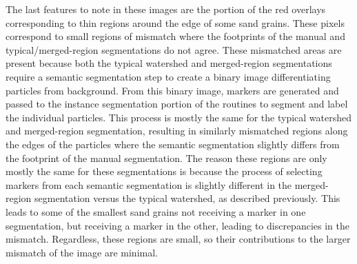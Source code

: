 The last features to note in these images are the portion of the red overlays
corresponding to thin regions around the edge of some sand grains. These pixels
correspond to small regions of mismatch where the footprints of the manual and
typical/merged-region segmentations do not agree. These mismatched areas are present
because both the typical watershed and merged-region segmentations require a semantic
segmentation step to create a binary image differentiating particles from background.
From this binary image, markers are generated and passed to the instance segmentation
portion of the routines to segment and label the individual particles. This process
is mostly the same for the typical watershed and merged-region segmentation, resulting in
similarly mismatched regions along the edges of the particles where the
semantic segmentation slightly differs from the footprint of the manual segmentation.
The reason these regions are only mostly the same for these segmentations is because the
process of selecting markers from each semantic segmentation is slightly different in the
merged-region segmentation versus the typical watershed, as described previously. This leads
to some of the smallest sand grains not receiving a marker in one segmentation, but receiving
a marker in the other, leading to discrepancies in the mismatch.
Regardless, these regions are small, so
their contributions to the larger mismatch of the image are minimal.

